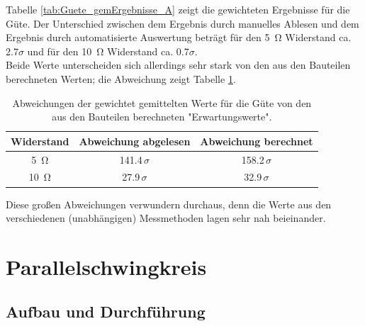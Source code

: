 \documentclass[12pt,a4paper]{article}
\begin{document}
Tabelle \ref{tab:Guete_gemErgebnisse_A} zeigt die gewichteten Ergebnisse für die Güte. Der Unterschied zwischen dem Ergebnis durch manuelles Ablesen und dem Ergebnis durch automatisierte Auswertung beträgt für den \SI{5}{\ohm} Widerstand ca. $2.7 \sigma$ und für den \SI{10}{\ohm} Widerstand ca. $0.7 \sigma$.\\
Beide Werte unterscheiden sich allerdings sehr stark von den aus den Bauteilen berechneten Werten; die Abweichung zeigt Tabelle \ref{tab:Guete_Abweichungen_A}.

\begin{table}
	\begin{center}
		\begin{tabular}{|c|c|c|}
			\hline 
			Widerstand & Abweichung abgelesen & Abweichung berechnet \\ 
			\hline 
			\SI{5}{\ohm} & 141.4$\, \sigma$ & 158.2$\, \sigma$ \\ 
			\hline 
			\SI{10}{\ohm} & 27.9$\, \sigma$ & 32.9$\, \sigma$ \\ 
			\hline 
		\end{tabular} 
		\caption{Abweichungen der gewichtet gemittelten Werte für die Güte von den aus den Bauteilen berechneten "Erwartungswerte".}
		\label{tab:Guete_Abweichungen_A}
	\end{center}
\end{table}

Diese großen Abweichungen verwundern durchaus, denn die Werte aus den verschiedenen (unabhängigen) Messmethoden lagen sehr nah beieinander.






\newpage

\section{Parallelschwingkreis}

\subsection{Aufbau und Durchführung}
\end{document}
